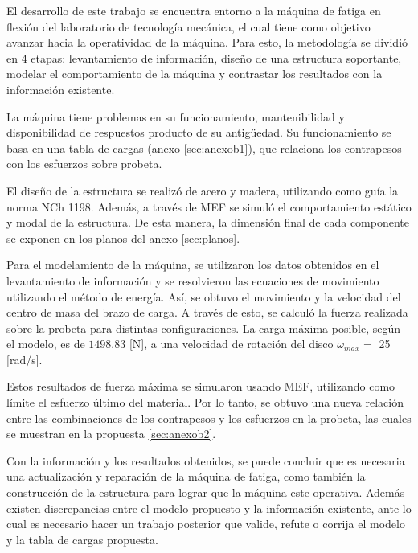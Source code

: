 
El desarrollo de este trabajo se encuentra entorno a la máquina de fatiga en flexión del laboratorio de tecnología mecánica, el cual tiene como objetivo avanzar hacia la operatividad de la máquina. Para esto, la metodología se dividió en 4 etapas: levantamiento de información, diseño de una estructura soportante, modelar el comportamiento de la máquina y contrastar los resultados con la información existente.

La máquina tiene problemas en su funcionamiento, mantenibilidad y disponibilidad de respuestos producto de su antigüedad. Su funcionamiento se basa en una tabla de cargas (anexo \ref{sec:anexob1}), que relaciona los contrapesos con los esfuerzos sobre probeta.

El diseño de la estructura se realizó de acero y madera, utilizando como guía la norma NCh 1198. Además, a través de MEF se simuló el comportamiento estático y modal de la estructura. De esta manera, la dimensión final de cada componente se exponen en los planos del anexo \ref{sec:planos}.

Para el modelamiento de la máquina, se utilizaron los datos obtenidos en el levantamiento de información y se resolvieron las ecuaciones de movimiento utilizando el método de energía. Así, se obtuvo el movimiento y la velocidad del centro de masa del brazo de carga. A través de esto, se calculó la fuerza realizada sobre la probeta para distintas configuraciones. La carga máxima posible, según el modelo, es de $1498.83$ [N], a una velocidad de rotación del disco $\omega_{max} =$ 25 [rad/s]. 

Estos resultados de fuerza máxima se simularon usando MEF, utilizando como límite el esfuerzo último del material. Por lo tanto, se obtuvo una nueva relación entre las combinaciones de los contrapesos y los esfuerzos en la probeta, las cuales se muestran en la propuesta \ref{sec:anexob2}.  

Con la información y los resultados obtenidos, se puede concluir que es necesaria una actualización y reparación de la máquina de fatiga, como también la construcción de la estructura para lograr que la máquina este operativa. Además existen discrepancias entre el modelo propuesto y la información existente, ante lo cual es necesario hacer un trabajo posterior que valide, refute o corrija el modelo y la tabla de cargas propuesta. 

